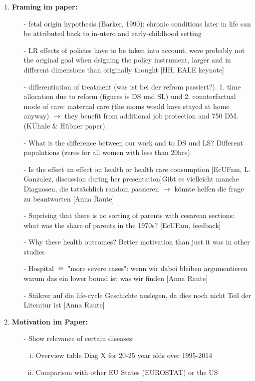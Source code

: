 \documentclass[11pt,a4paper]{article}
\begin{document}
{\begin{enumerate}
\item \textbf{Framing im paper:} \vspace{-1em}
\begin{itemize}
	\item[-] fetal origin hypothesis (Barker, 1990): chronic conditions later in life can be attributed back to in-utero and early-childhood setting
	\item[-] LR effects of policies have to be taken into account, were probably not the original goal when dsigning the policy instrument, larger and in different dimensions than originally thought [HH, EALE keynote]
	\item[-] differentiation of treatment (was ist bei der refrom passiert?). 1. time allocation due to reform (figures is DS und SL) und 2. counterfactual mode of care: maternal care (the moms would have stayed at home anyway) $\rightarrow$ they benefit from additional job protection and 750 DM.
	(KÜhnle \& Hübner paper).
	\item[-] What is the difference between our work and to DS und LS? Different populations (zeros for all women with less than 20hrs).
	\item[-] Is the effect an effect on health or health care consumption [EcUFam, L. Ganzalez, discussion during her presentation]\newline Gibt es vielleicht manche Diagnosen, die tatsächlich random passieren $\rightarrow$ könnte helfen die frage zu beantworten [Anna Raute]
	\item[-] Suprising that there is no sorting of parents with cesarean sections: what was the share of parents in the 1970s? [EcUFam, feedback]
	\item[-] Why these health outcomes? Better motivation than just it was in other studies
	\item[-] Hospital $\mathrel{\widehat{=}}$ "more severe cases": wenn wir dabei bleiben argumentieren warum das ein lower bound ist was wir finden [Anna Raute]
	\item[-] Stäkrer auf die life-cycle Geschichte auslegen, da dies noch nicht Teil der Literatur ist [Anna Raute]
\end{itemize}

\item \textbf{Motivation im Paper:}
\begin{itemize}
	\item[-] Show relevance of certain diseases: 
	\begin{enumerate}[(i)]
	\item Overview table Diag X for 20-25 year olds over 1995-2014
	\item Comparison with other EU States (EUROSTAT) or the US
	\end{enumerate}
\end{itemize}


\end{enumerate}}
\end{document}
